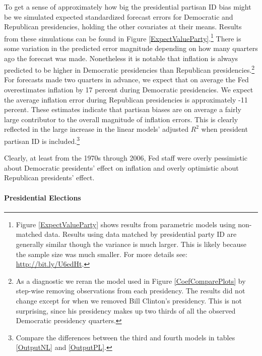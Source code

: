 \documentclass[a4paper]{article}\usepackage{graphicx, color}
\begin{document}
To get a sense of approximately how big the presidential partisan ID bias might be we simulated expected standardized forecast errors for Democratic and Republican presidencies, holding the other covariates at their means. Results from these simulations can be found in Figure \ref{ExpectValueParty}.\footnote{Figure \ref{ExpectValueParty} shows results from parametric models using non-matched data. Results using data matched by presidential party ID are generally similar though the variance is much larger. This is likely because the sample size was much smaller. For more details see: \url{http://bit.ly/U6edHt}.} There is some variation in the predicted error magnitude depending on how many quarters ago the forecast was made. Nonetheless it is notable that inflation is always predicted to be higher in Democratic presidencies than Republican presidencies.\footnote{As a diagnostic we reran the model used in Figure \ref{CoefComparePlots} by step-wise removing observations from each presidency. The results did not change except for when we removed Bill Clinton's presidency. This is not surprising, since his presidency makes up two thirds of all the observed Democratic presidency quarters.}  For forecasts made two quarters in advance, we expect that on average the Fed overestimates inflation by 17 percent during Democratic presidencies. We expect the average inflation error during Republican presidencies is approximately -11 percent. These estimates indicate that partisan biases are on average a fairly large contributor to the overall magnitude of inflation errors. This is clearly reflected in the large increase in the linear models' adjusted $R^{2}$ when president partisan ID is included.\footnote{Compare the differences between the third and fourth models in tables \ref{OutputNL} and \ref{OutputPL}.} 

Clearly, at least from the 1970s through 2006, Fed staff were overly pessimistic about Democratic presidents' effect on inflation and overly optimistic about Republican presidents' effect. 

\paragraph{Presidential Elections}
\end{document}
